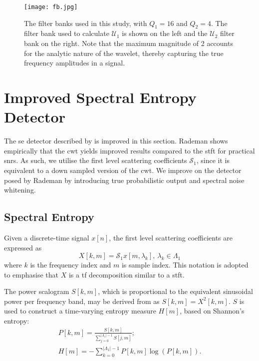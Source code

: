 {\begin{figure}[h]
    \centering
    \texttt{[image: fb.jpg]}
    \caption[The filter banks used in this study.]{The filter banks used in this study, with $Q_1 = 16$ and $Q_2 = 4$. The filter bank used to calculate $\mathcal{U}_1$ is shown on the left and the $\mathcal{U}_2$ filter bank on the right. Note that the maximum magnitude of 2 accounts for the analytic nature of the wavelet, thereby capturing the true frequency amplitudes in a signal.}
    \label{fig:fb}
\end{figure}


\section{Improved Spectral Entropy Detector}
The \ac{se} detector described by \citet{mypaper} is improved in this section. Rademan shows empirically that the \ac{cwt} yields improved results compared to the \ac{stft} for practical \acp{snr}. As such, we utilise the first level scattering coefficients $\mathcal{S}_{1}$, since it is equivalent to a down sampled version of the \ac{cwt}. We improve on the detector posed by Rademan by introducing true probabilistic output and spectral noise whitening.

\subsection{Spectral Entropy}
\label{sec:spectral_entropy}
Given a discrete-time signal $x[n]$, the first level scattering coefficients are expressed as
\begin{equation*}
	X[k, m] = \mathcal{S}_1x[m, \lambda_k],\ \lambda_k \in \Lambda_1
\end{equation*}
where $k$ is the frequency index and $m$ is sample index. This notation is adopted to emphasise that $X$ is a \ac{tf} decomposition similar to a \ac{stft}.

The power scalogram $S[k, m]$, which is proportional to the equivalent sinusoidal power per frequency band, may be derived from as $S[k,m] = X^2[k, m]$. $S$ is used to construct a time-varying entropy measure $H[m]$, based on Shannon's entropy:
\begin{gather}
\label{eqn:specdist}
	P[k,m] = \frac{S[k,m]}{\sum_{j=0}^{|\Lambda_1|-1} S[j,m]}; \\
\label{eqn:entropy}
	H[m] = - \sum_{k=0}^{|\Lambda_1|-1} P[k,m] \log (P[k,m]).
\end{gather}

}
